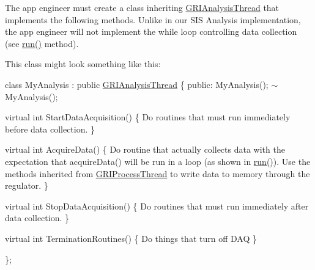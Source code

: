 \-The app engineer must create a class inheriting \hyperlink{classGRIAnalysisThread}{\-G\-R\-I\-Analysis\-Thread} that implements the following methods. \-Unlike in our \-S\-I\-S \-Analysis implementation, the app engineer will not implement the while loop controlling data collection (see \hyperlink{classGRIAnalysisThread_acc07ee77c102f8bac877efe9938d4586}{run()} method).

\-This class might look something like this\-:

class \-My\-Analysis \-: public \hyperlink{classGRIAnalysisThread}{\-G\-R\-I\-Analysis\-Thread} \{ public\-: \-My\-Analysis(); $\sim$\-My\-Analysis();

virtual int \-Start\-Data\-Acquisition() \{ \-Do routines that must run immediately before data collection. \}

virtual int \-Acquire\-Data() \{ \-Do routine that actually collects data with the expectation that acquire\-Data() will be run in a loop (as shown in \hyperlink{classGRIAnalysisThread_acc07ee77c102f8bac877efe9938d4586}{run()}). \-Use the methods inherited from \hyperlink{classGRIProcessThread}{\-G\-R\-I\-Process\-Thread} to write data to memory through the regulator. \}

virtual int \-Stop\-Data\-Acquisition() \{ \-Do routines that must run immediately after data collection. \}

virtual int \-Termination\-Routines() \{ \-Do things that turn off \-D\-A\-Q \}

\}; 

